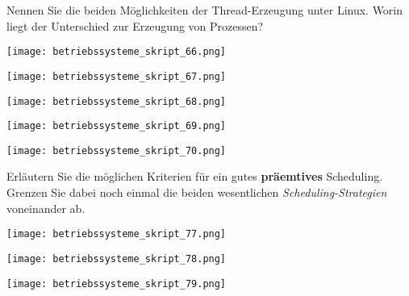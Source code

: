 \documentclass{article}
\begin{document}
\begin{tcolorbox}[colback=white!10!white,colframe=lightgray!75!black,
  savelowerto=\jobname_ex.tex,breakable,enhanced,lines before break=40]

\begin{center}
Nennen Sie die beiden Möglichkeiten der Thread-Erzeugung unter Linux. 
Worin liegt der Unterschied zur Erzeugung von Prozessen?

\end{center}

\tcblower

\justifying
\begin{center}
\texttt{[image: betriebssysteme\_skript\_66.png]}
\end{center}
\begin{center}
\texttt{[image: betriebssysteme\_skript\_67.png]}
\end{center}
\begin{center}
\texttt{[image: betriebssysteme\_skript\_68.png]}
\end{center}
\begin{center}
\texttt{[image: betriebssysteme\_skript\_69.png]}
\end{center}
\begin{center}
\texttt{[image: betriebssysteme\_skript\_70.png]}
\end{center}

\end{tcolorbox}
\begin{tcolorbox}[colback=white!10!white,colframe=lightgray!75!black,
  savelowerto=\jobname_ex.tex,breakable,enhanced,lines before break=40]

\begin{center}
Erläutern Sie die möglichen Kriterien für ein gutes 
\textbf{präemtives
} Scheduling. Grenzen Sie dabei noch einmal die beiden wesentlichen 
\textit{Scheduling-Strategien
} voneinander ab.

\end{center}

\tcblower

\justifying
\begin{center}
\texttt{[image: betriebssysteme\_skript\_77.png]}
\end{center}
\begin{center}
\texttt{[image: betriebssysteme\_skript\_78.png]}
\end{center}
\begin{center}
\texttt{[image: betriebssysteme\_skript\_79.png]}
\end{center}

\end{tcolorbox}
\end{document}
